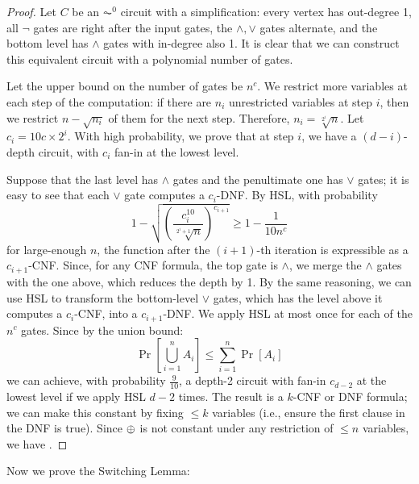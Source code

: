 \begin{proof}
Let $C$ be an $\AC^0$ circuit with a simplification: every vertex has out-degree 1, all $\neg$ gates are right after the input gates, the $\wedge, \vee$ gates alternate, and the bottom level has $\wedge$ gates with in-degree also 1. It is clear that we can construct this equivalent circuit with a polynomial number of gates.

\par Let the upper bound on the number of gates be $n^c$. We restrict more variables at each step of the computation: if there are $n_i$ unrestricted variables at step $i$, then we restrict $n-\sqrt{n_i}$ of them for the next step. Therefore, $n_i = \sqrt[2^i]{n}$. Let $c_i = 10c \times 2^i$. With high probability, we prove that at step $i$, we have a $(d-i)$-depth circuit, with $c_i$ fan-in at the lowest level. 

\par Suppose that the last level has $\wedge$ gates and the penultimate one has $\vee$ gates; it is easy to see that each $\vee$ gate computes a $c_i$-DNF. By HSL, with probability
\[
1-\sqrt{\left(\frac{c_i^{10}}{\sqrt[2^i+1]{n}}\right)^{c_{i+1}}} \ge 1 - \frac{1}{10n^c}
\]
for large-enough $n$, the function after the $(i+1)$-th iteration is expressible as a $c_{i+1}$-CNF. Since, for any CNF formula, the top gate is $\wedge$, we merge the $\wedge$ gates with the one above, which reduces the depth by 1. By the same reasoning, we can use HSL to transform the bottom-level $\vee$ gates, which has the level above it computes a $c_i$-CNF, into a $c_{i+1}$-DNF. We apply HSL at most once for each of the $n^c$ gates. Since by the union bound:
\[
\Pr[\bigcup_{i=1}^n A_i] \le \sum_{i=1}^n \Pr[A_i]
\]
we can achieve, with probability $\frac{9}{10}$, a depth-2 circuit with fan-in $c_{d-2}$ at the lowest level if we apply HSL $d-2$ times. The result is a $k$-CNF or DNF formula; we can make this constant by fixing $\le k$ variables (i.e., ensure the first clause in the DNF is true). Since $\oplus$ is not constant under any restriction of $\le n$ variables, we have .
\end{proof}
Now we prove the Switching Lemma:
